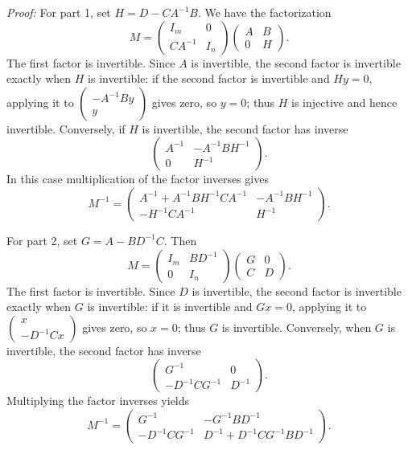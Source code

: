 \documentclass[a4paper,11pt,abstract=true]{scrartcl}
\theoremstyle{dotlessP}
\theoremstyle{dotlessS}
\theoremstyle{remark}
\theoremstyle{definition}
\begin{document}
\begin{claim_box}
\textit{Proof:} For part 1, set $H=D-CA^{-1}B$. We have the factorization
\[
M=
\begin{pmatrix}I_m&0\\CA^{-1}&I_n\end{pmatrix}
\begin{pmatrix}A&B\\0&H\end{pmatrix}.
\]
The first factor is invertible. Since $A$ is invertible, the second
factor is invertible exactly when $H$ is invertible: if the second
factor is invertible and $Hy=0$, applying it to
$\begin{pmatrix}-A^{-1}By\\y\end{pmatrix}$ gives zero, so $y=0$;
thus $H$ is injective and hence invertible. Conversely, if $H$ is
invertible, the second factor has inverse
\[
\begin{pmatrix}A^{-1}&-A^{-1}BH^{-1}\\0&H^{-1}\end{pmatrix}.
\]
In this case multiplication of the factor inverses gives
\[
M^{-1}=
\begin{pmatrix}
A^{-1}+A^{-1}BH^{-1}CA^{-1}&-A^{-1}BH^{-1}\\
-H^{-1}CA^{-1}&H^{-1}
\end{pmatrix}.
\]

For part 2, set $G=A-BD^{-1}C$. Then
\[
M=
\begin{pmatrix}I_m&BD^{-1}\\0&I_n\end{pmatrix}
\begin{pmatrix}G&0\\C&D\end{pmatrix}.
\]
The first factor is invertible. Since $D$ is invertible, the second
factor is invertible exactly when $G$ is invertible: if it is invertible
and $Gx=0$, applying it to
$\begin{pmatrix}x\\-D^{-1}Cx\end{pmatrix}$ gives zero, so $x=0$;
thus $G$ is invertible. Conversely, when $G$ is invertible, the second
factor has inverse
\[
\begin{pmatrix}G^{-1}&0\\-D^{-1}CG^{-1}&D^{-1}\end{pmatrix}.
\]
Multiplying the factor inverses yields
\[
M^{-1}=
\begin{pmatrix}
G^{-1}&-G^{-1}BD^{-1}\\
-D^{-1}CG^{-1}&D^{-1}+D^{-1}CG^{-1}BD^{-1}
\end{pmatrix}.
\]


\end{claim_box}
\end{document}
